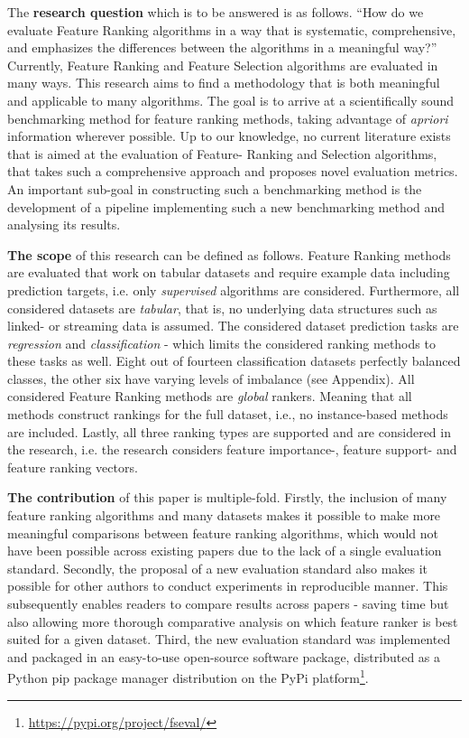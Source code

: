\documentclass[../main.tex]{subfiles}
\begin{document}
The \textbf{research question} which is to be answered is as follows. ``How do we evaluate Feature Ranking algorithms in a way that is systematic, comprehensive, and emphasizes the differences between the algorithms in a meaningful way?'' Currently, Feature Ranking and Feature Selection algorithms are evaluated in many ways. This research aims to find a methodology that is both meaningful and applicable to many algorithms.
The goal is to arrive at a scientifically sound benchmarking method for feature ranking methods, taking advantage of \textit{\gls{apriori}} information wherever possible. Up to our knowledge, no current literature exists that is aimed at the evaluation of Feature- Ranking and Selection algorithms, that takes such a comprehensive approach and proposes novel evaluation metrics. An important sub-goal in constructing such a benchmarking method is the development of a pipeline implementing such a new benchmarking method and analysing its results.


\textbf{The scope} of this research can be defined as follows. Feature Ranking methods are evaluated that work on tabular datasets and require example data including prediction targets, i.e. only \textit{supervised} algorithms are considered. Furthermore, all considered datasets are \textit{tabular}, that is, no underlying data structures such as linked- or streaming data is assumed. The considered dataset prediction tasks are \textit{regression} and \textit{classification} - which limits the considered ranking methods to these tasks as well. Eight out of fourteen classification datasets perfectly balanced classes, the other six have varying levels of imbalance (see Appendix). All considered Feature Ranking methods are \textit{global} rankers. Meaning that all methods construct rankings for the full dataset, i.e., no instance-based methods are included. Lastly, all three ranking types are supported and are considered in the research, i.e. the research considers feature importance-, feature support- and feature ranking vectors.



\textbf{The contribution} of this paper is multiple-fold. Firstly, the inclusion of many feature ranking algorithms and many datasets makes it possible to make more meaningful comparisons between feature ranking algorithms, which would not have been possible across existing papers due to the lack of a single evaluation standard. Secondly, the proposal of a new evaluation standard also makes it possible for other authors to conduct experiments in reproducible manner. This subsequently enables readers to compare results across papers - saving time but also allowing more thorough comparative analysis on which feature ranker is best suited for a given dataset. Third, the new evaluation standard was implemented and packaged in an easy-to-use open-source software package, distributed as a Python  pip package manager distribution on the PyPi platform\footnote{\href{https://pypi.org/project/fseval/}{https://pypi.org/project/fseval/}}.
\end{document}

